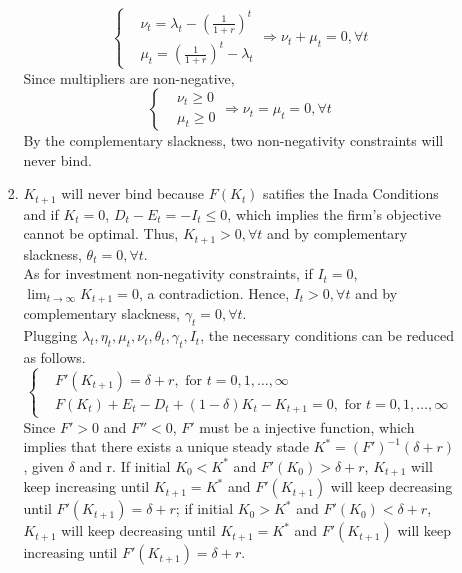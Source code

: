 \documentclass{article}
\begin{document}
\begin{enumerate}
\begin{enumerate}
\begin{enumerate}
                \begin{equation*}
                    \left\{\begin{aligned}
                        &\nu_t=\lambda_t-(\frac{1}{1+r})^t\\
                        &\mu_t=(\frac{1}{1+r})^t-\lambda_t
                    \end{aligned}\right.
                    \Rightarrow \nu_t+\mu_t=0,\forall t
                \end{equation*}
                Since multipliers are non-negative,
                \begin{equation*}
                    \left\{\begin{aligned}
                        &\nu_t\ge0\\
                        &\mu_t\ge0
                    \end{aligned}\right.
                    \Rightarrow \nu_t=\mu_t=0,\forall t
                \end{equation*}
                By the complementary slackness, two non-negativity constraints will never bind.
                \item $K_{t+1}$ will never bind because $F(K_t)$ satifies the Inada Conditions and if $K_t=0$, $D_t-E_t=-I_t\le0$, which implies the firm's objective cannot be optimal. Thus, $K_{t+1}>0,\forall t$ and by complementary slackness, $\theta_t=0,\forall t$.\\
                As for investment non-negativity constraints, if $I_t=0$, $\lim_{t\to\infty}K_{t+1}=0$, a contradiction. Hence, $I_t>0,\forall t$ and by complementary slackness, $\gamma_t=0,\forall t$.\\
                Plugging $\lambda_t,\eta_t,\mu_t,\nu_t,\theta_t,\gamma_t,I_t$, the necessary conditions can be reduced as follows.
                \begin{equation*}
                    \left\{\begin{aligned}
                        &{F}'(K_{t+1})=\delta+r,\text{ for }t=0,1,\dots,\infty\\
                        &F(K_t)+E_t-D_t+(1-\delta)K_t-K_{t+1}=0,\text{ for }t=0,1,\dots,\infty
                    \end{aligned}\right.
                \end{equation*}
                Since ${F}'>0$ and ${F}''<0$, ${F}'$ must be a injective function, which implies that there exists a unique steady stade $K^\ast=(F')^{-1}(\delta+r)$, given $\delta$ and r.
                If initial $K_0<K^\ast$ and ${F}'(K_0)>\delta+r$, $K_{t+1}$ will keep increasing until $K_{t+1}=K^\ast$ and ${F}'(K_{t+1})$ will keep decreasing until ${F}'(K_{t+1})=\delta+r$; if initial $K_0>K^\ast$ and ${F}'(K_0)<\delta+r$, $K_{t+1}$ will keep decreasing until $K_{t+1}=K^\ast$ and ${F}'(K_{t+1})$ will keep increasing until ${F}'(K_{t+1})=\delta+r$.

\end{enumerate}
\end{enumerate}
\end{enumerate}
\end{document}
